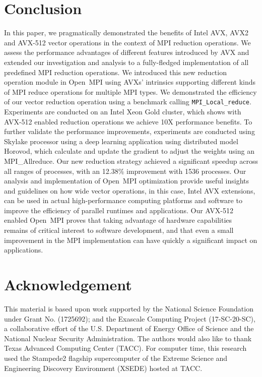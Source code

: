 \documentclass[sigconf]{acmart}
\newcommand{\mpifunc}[1]{\lstinline"MPI_#1"\xspace}
\newcommand{\ompi}[0]{Open~MPI\xspace}
\newcommand{\mpi}[0]{\textsc{MPI}\xspace}
\begin{document}
\section{Conclusion}\label{sec:conclusion}
In this paper, we pragmatically demonstrated the benefits of Intel
AVX, AVX2 and AVX-512 vector operations in the context of MPI reduction
operations. We assess the performance advantages of different features
introduced by AVX and extended our investigation and analysis to a
fully-fledged implementation of all predefined MPI reduction
operations.
%
We introduced this new reduction operation module in \ompi using AVXs'
intrinsics supporting different kinds of \mpi reduce operations for
multiple \mpi types. We demonstrated the efficiency of our vector
reduction operation using a benchmark calling
\mpifunc{Local_reduce}. Experiments are conducted on an Intel Xeon
Gold cluster, which shows with AVX-512 enabled reduction operations we
achieve 10X performance benefits.
%
To further validate the performance improvements, experiments are
conducted using Skylake processor using a deep learning application
using distributed model Horovod, which calculate and update the
gradient to adjust the weights using an MPI\_Allreduce.  Our new
reduction strategy achieved a significant speedup across all ranges of
processes, with an 12.38\% improvement with 1536 processes.  Our
analysis and implementation of \ompi optimization provide useful
insights and guidelines on how wide vector operations, in this case,
Intel AVX extensions, can be used in actual high-performance computing
platforms and software to improve the efficiency of parallel runtimes
and applications.
%
Our AVX-512 enabled \ompi proves that taking advantage of hardware
capabilities remains of critical interest to software development, and
that even a small improvement in the MPI implementation can have
quickly a significant impact on applications.

\section*{Acknowledgement}
%
This material is based upon work supported by the National Science Foundation under Grant No. (1725692); and the Exascale Computing Project (17-SC-20-SC), a collaborative effort of the
U.S. Department of Energy Office of Science and the National Nuclear Security Administration.
The authors would also like to thank
Texas Advanced Computing Center (TACC). For computer time, this research used
the Stampede2 flagship supercomputer of the Extreme Science and Engineering Discovery Environment (XSEDE) hosted at TACC.
%
%


\end{document}
